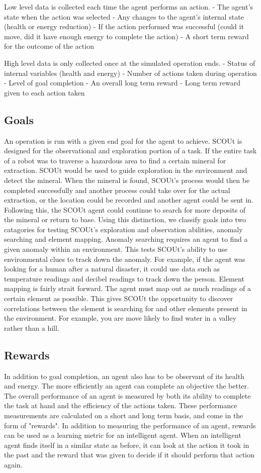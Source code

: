 Low level data is collected each time the agent performs an action.
- The agent's state when the action was selected
- Any changes to the agent's internal state (health or energy reduction)
- If the action performed was successful (could it move, did it have enough energy to complete the action)
- A short term reward for the outcome of the action


High level data is only collected once at the simulated operation ends.
- Status of internal variables (health and energy)
- Number of actions taken during operation
- Level of goal completion
- An overall long term reward
- Long term reward given to each action taken


\subsection{Goals}
An operation is run with a given end goal for the agent to achieve.
SCOUt is designed for the observational and exploration portion of a task.
If the entire task of a robot was to traverse a hazardous area to find a certain mineral for extraction.
SCOUt would be used to guide exploration in the environment and detect the mineral.
When the mineral is found, SCOUt's process would then be completed successfully and another process could take over for the actual extraction, or the location could be recorded and another agent could be sent in.
Following this, the SCOUt agent could continue to search for more deposits of the mineral or return to base.
Using this distinction, we classify goals into two catagories for testing SCOUt's exploration and observation abilities, anomaly searching and element mapping.
Anomaly searching requires an agent to find a given anomaly within an environment.
This tests SCOUt's ability to use environmental clues to track down the anomaly.
For example, if the agent was looking for a human after a natural disaster, it could use data such as temperature readings and decibel readings to track down the person.
Element mapping is fairly strait forward.
The agent must map out as much readings of a certain element as possible.
This gives SCOUt the opportunity to discover correlations between the element is searching for and other elements present in the environment.
For example, you are move likely to find water in a valley rather than a hill.


\subsection{Rewards}
In addition to goal completion, an agent also has to be observant of its health and energy.
The more efficiently an agent can complete an objective the better.
The overall performance of an agent is measured by both its ability to complete the task at hand and the efficiency of the actions taken.
These performance measurements are calculated on a short and long term basis, and come in the form of "rewards".
In addition to measuring the performance of an agent, rewards can be used as a learning metric for an intelligent agent.
When an intelligent agent finds itself in a similar state as before, it can look at the action it took in the past and the reward that was given to decide if it should perform that action again.

